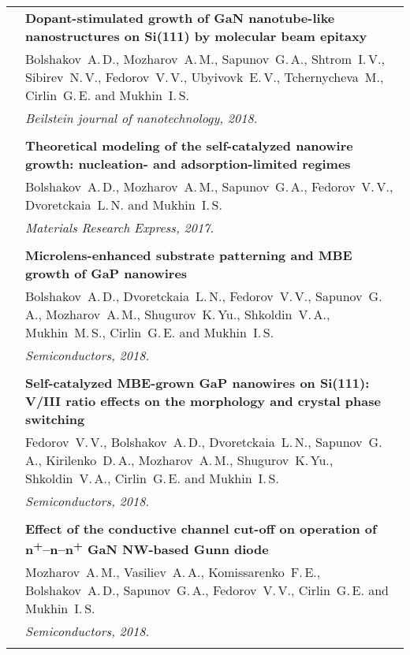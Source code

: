 \documentclass[letterpaper, 11pt]{article}
\begin{document}
\begin{longtable}{p{1.3in}p{4.8in}}
        & \textbf{Dopant-stimulated growth of GaN nanotube-like nanostructures
        on Si(111) by molecular beam epitaxy} \\
        & Bolshakov~A.\,D., Mozharov~A.\,M., Sapunov~G.\,A., Shtrom~I.\,V.,
        Sibirev~N.\,V., Fedorov~V.\,V., Ubyivovk~E.\,V., Tchernycheva~M.,
        Cirlin~G.\,E. and Mukhin~I.\,S. \\
		& \textit{Beilstein journal of nanotechnology, 2018.}\\
		& \\

		\nohyphens{\color{OliveGreen}{Q2 Publications}}
		& \textbf{Theoretical modeling of the self-catalyzed nanowire growth: nucleation- and adsorption-limited regimes} \\
		& Bolshakov~A.\,D., Mozharov~A.\,M., Sapunov~G.\,A., Fedorov~V.\,V., Dvoretckaia~L.\,N. and Mukhin~I.\,S. \\
		& \textit{Materials Research Express, 2017.}\\
		& \\

		\nohyphens{\color{OliveGreen}{Q3 Publications}}
		& \textbf{Microlens-enhanced substrate patterning and MBE growth of GaP nanowires} \\
		& Bolshakov~A.\,D., Dvoretckaia~L.\,N., Fedorov~V.\,V., Sapunov~G.\,A., Mozharov~A.\,M., Shugurov~K.\,Yu., Shkoldin~V.\,A., Mukhin~M.\,S., Cirlin~G.\,E. and Mukhin~I.\,S. \\
		& \textit{Semiconductors, 2018.}\\
		& \\

		& \textbf{Self-catalyzed MBE-grown GaP nanowires on Si(111): V/III ratio effects on the morphology and crystal phase switching} \\
		& Fedorov~V.\,V., Bolshakov~A.\,D., Dvoretckaia~L.\,N., Sapunov~G.\,A., Kirilenko~D.\,A., Mozharov~A.\,M., Shugurov~K.\,Yu., Shkoldin~V.\,A., Cirlin~G.\,E. and Mukhin~I.\,S. \\
		& \textit{Semiconductors, 2018.}\\
		& \\
		
		& \textbf{Effect of the conductive channel cut-off on operation of n\textsuperscript{+}--n--n\textsuperscript{+} GaN NW-based Gunn diode} \\
		& Mozharov~A.\,M., Vasiliev~A.\,A., Komissarenko~F.\,E., Bolshakov~A.\,D., Sapunov~G.\,A., Fedorov~V.\,V., Cirlin~G.\,E. and Mukhin~I.\,S. \\
		& \textit{Semiconductors, 2018.}\\
		& \\


\end{longtable}
\end{document}
